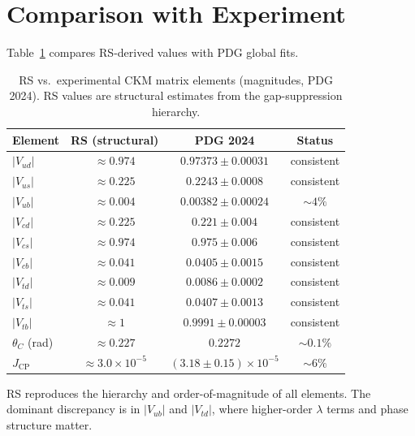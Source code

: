 \documentclass[12pt,a4paper]{article}
\theoremstyle{definition}
\theoremstyle{remark}
\begin{document}
\section{Comparison with Experiment}
\label{sec:comparison}

Table~\ref{tab:ckm} compares RS-derived values with PDG global fits.

\begin{table}[ht]
  \centering
  \caption{RS vs.\ experimental CKM matrix elements (magnitudes, PDG 2024).
    RS values are structural estimates from the gap-suppression hierarchy.}
  \label{tab:ckm}
  \begin{tabular}{lccc}
    \toprule
    Element & RS (structural) & PDG 2024 & Status \\
    \midrule
    $|V_{ud}|$ & $\approx 0.974$ & $0.97373 \pm 0.00031$ & consistent \\
    $|V_{us}|$ & $\approx 0.225$ & $0.2243 \pm 0.0008$ & consistent \\
    $|V_{ub}|$ & $\approx 0.004$ & $0.00382 \pm 0.00024$ & $\sim4\%$ \\
    $|V_{cd}|$ & $\approx 0.225$ & $0.221 \pm 0.004$ & consistent \\
    $|V_{cs}|$ & $\approx 0.974$ & $0.975 \pm 0.006$ & consistent \\
    $|V_{cb}|$ & $\approx 0.041$ & $0.0405 \pm 0.0015$ & consistent \\
    $|V_{td}|$ & $\approx 0.009$ & $0.0086 \pm 0.0002$ & consistent \\
    $|V_{ts}|$ & $\approx 0.041$ & $0.0407 \pm 0.0013$ & consistent \\
    $|V_{tb}|$ & $\approx 1$ & $0.9991 \pm 0.00003$ & consistent \\
    \midrule
    $\theta_C$ (rad) & $\approx 0.227$ & $0.2272$ & $\sim 0.1\%$ \\
    $J_{\mathrm{CP}}$ & $\approx 3.0\times10^{-5}$ &
      $(3.18\pm0.15)\times10^{-5}$ & $\sim 6\%$ \\
    \bottomrule
  \end{tabular}
\end{table}

RS reproduces the hierarchy and order-of-magnitude of all elements.
The dominant discrepancy is in $|V_{ub}|$ and $|V_{td}|$, where
higher-order $\lambda$ terms and phase structure matter.

\end{document}
